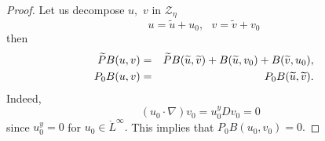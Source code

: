 \documentclass[11pt]{article}
\begin{document}
\begin{proof} Let us decompose $u,$ $v$ in $\mathcal{Z}_{\eta}$%
\begin{equation*}
u=\widetilde{u}+u_{0},\text{ }v=\widetilde{v}+v_{0}
\end{equation*}%
then%
\begin{eqnarray}
\widetilde{P}B(u,v) &=&\widetilde{P}B(\widetilde{u},\widetilde{v})+B(%
\widetilde{u},v_{0})+B(\widetilde{v},u_{0}),  \notag \\
P_{0}B(u,v) &=&P_{0}B(\widetilde{u},\widetilde{v}).
\label{quadratic identity}
\end{eqnarray}%
Indeed, 
\begin{equation*}
(u_{0}\cdot \nabla )v_{0}=u_{0}^{y}Dv_{0}=0\text{ }
\end{equation*}%
since $u_{0}^{y}=0$ for $u_{0}\in \mathring{L}^{\infty }.$ This implies that 
$P_{0}B(u_{0},v_{0})=0.$


\end{proof}
\end{document}
